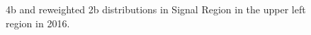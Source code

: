\begin{figure}[ht]
 
 
    \caption{4b and reweighted 2b distributions in Signal Region in the upper left region in 2016.}
    \label{fig:upper-left-4b-SR-2016}
\end{figure}



